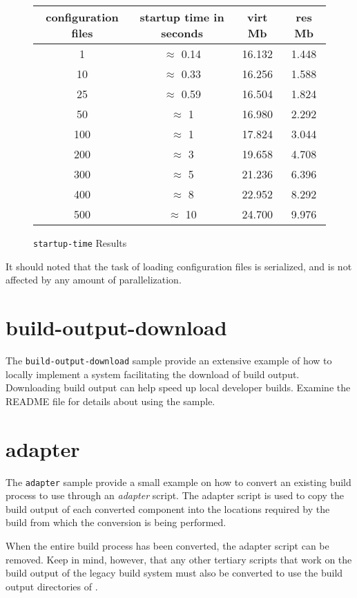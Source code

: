 \begin{figure}[tb]
  \hrulefill\vspace{10pt}
  \begin{center}
    \begin{tabular}{|c|c|c|c|}
      \hline configuration files  & startup time in seconds & virt Mb & res Mb \\
      \hline   1 & $\approx$ 0.14  & 16.132 & 1.448 \\
      \hline  10 & $\approx$ 0.33  & 16.256 & 1.588 \\
      \hline  25 & $\approx$ 0.59  & 16.504 & 1.824 \\
      \hline  50 & $\approx$ 1  & 16.980 & 2.292 \\
      \hline 100 & $\approx$ 1  & 17.824 & 3.044 \\
      \hline 200 & $\approx$ 3  & 19.658 & 4.708 \\
      \hline 300 & $\approx$ 5  & 21.236 & 6.396 \\
      \hline 400 & $\approx$ 8  & 22.952 & 8.292 \\
      \hline 500 & $\approx$ 10 & 24.700 & 9.976 \\
      \hline
    \end{tabular}
  \end{center}
\caption{\texttt{startup-time} Results}\label{samples:startup-time-results}
  \hrulefill
\end{figure}

It should noted that the task of loading configuration files is
serialized, and is not affected by any amount of parallelization.

\section{build-output-download}

The \texttt{build-output-download} sample provide an extensive example
of how to locally implement a system facilitating the download of
build output.  Downloading build output can help speed up local
developer builds.  Examine the README file for details about using the
sample.

\section{adapter}\label{samples:adapter}

The \texttt{adapter} sample provide a small example on how to convert
an existing build process to use \lmsbw through an \emph{adapter}
script.  The adapter script is used to copy the build output of each
converted component into the locations required by the build from
which the conversion is being performed.

When the entire build process has been converted, the adapter script
can be removed.  Keep in mind, however, that any other tertiary
scripts that work on the build output of the legacy build system must
also be converted to use the build output directories of \lmsbw.
